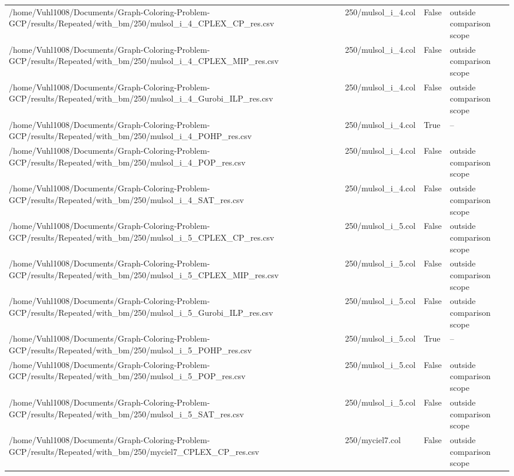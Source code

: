 \begin{table}[htbp]
\begin{tabular}{llll}
/home/Vuhl1008/Documents/Graph-Coloring-Problem-GCP/results/Repeated/with\_bm/250/mulsol\_i\_4\_CPLEX\_CP\_res.csv & 250/mulsol\_i\_4.col & False & outside comparison scope \\
/home/Vuhl1008/Documents/Graph-Coloring-Problem-GCP/results/Repeated/with\_bm/250/mulsol\_i\_4\_CPLEX\_MIP\_res.csv & 250/mulsol\_i\_4.col & False & outside comparison scope \\
/home/Vuhl1008/Documents/Graph-Coloring-Problem-GCP/results/Repeated/with\_bm/250/mulsol\_i\_4\_Gurobi\_ILP\_res.csv & 250/mulsol\_i\_4.col & False & outside comparison scope \\
/home/Vuhl1008/Documents/Graph-Coloring-Problem-GCP/results/Repeated/with\_bm/250/mulsol\_i\_4\_POHP\_res.csv & 250/mulsol\_i\_4.col & True & -- \\
/home/Vuhl1008/Documents/Graph-Coloring-Problem-GCP/results/Repeated/with\_bm/250/mulsol\_i\_4\_POP\_res.csv & 250/mulsol\_i\_4.col & False & outside comparison scope \\
/home/Vuhl1008/Documents/Graph-Coloring-Problem-GCP/results/Repeated/with\_bm/250/mulsol\_i\_4\_SAT\_res.csv & 250/mulsol\_i\_4.col & False & outside comparison scope \\
/home/Vuhl1008/Documents/Graph-Coloring-Problem-GCP/results/Repeated/with\_bm/250/mulsol\_i\_5\_CPLEX\_CP\_res.csv & 250/mulsol\_i\_5.col & False & outside comparison scope \\
/home/Vuhl1008/Documents/Graph-Coloring-Problem-GCP/results/Repeated/with\_bm/250/mulsol\_i\_5\_CPLEX\_MIP\_res.csv & 250/mulsol\_i\_5.col & False & outside comparison scope \\
/home/Vuhl1008/Documents/Graph-Coloring-Problem-GCP/results/Repeated/with\_bm/250/mulsol\_i\_5\_Gurobi\_ILP\_res.csv & 250/mulsol\_i\_5.col & False & outside comparison scope \\
/home/Vuhl1008/Documents/Graph-Coloring-Problem-GCP/results/Repeated/with\_bm/250/mulsol\_i\_5\_POHP\_res.csv & 250/mulsol\_i\_5.col & True & -- \\
/home/Vuhl1008/Documents/Graph-Coloring-Problem-GCP/results/Repeated/with\_bm/250/mulsol\_i\_5\_POP\_res.csv & 250/mulsol\_i\_5.col & False & outside comparison scope \\
/home/Vuhl1008/Documents/Graph-Coloring-Problem-GCP/results/Repeated/with\_bm/250/mulsol\_i\_5\_SAT\_res.csv & 250/mulsol\_i\_5.col & False & outside comparison scope \\
/home/Vuhl1008/Documents/Graph-Coloring-Problem-GCP/results/Repeated/with\_bm/250/myciel7\_CPLEX\_CP\_res.csv & 250/myciel7.col & False & outside comparison scope \\

\end{tabular}
\end{table}
